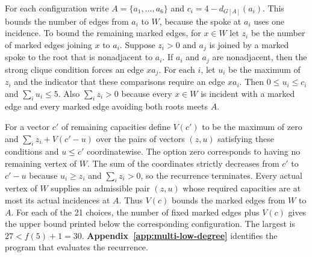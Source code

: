 \documentclass[preprint,11pt,numbers]{elsarticle-arxiv}
\numberwithin{equation}{section}
\theoremstyle{definition}
\begin{document}
For each configuration write $A=\{a_1,\ldots,a_6\}$ and
$c_i=4-d_{G[A]}(a_i)$. This bounds the number of edges from
$a_i$ to $W$, because the spoke at $a_i$ uses one incidence.
To bound the remaining marked edges, for $x\in W$ let $z_i$
be the number of marked edges joining $x$ to $a_i$. Suppose
$z_i>0$ and $a_j$ is joined by a marked spoke to the root that
is nonadjacent to $a_i$. If $a_i$ and $a_j$ are nonadjacent,
then the strong clique condition forces an edge $xa_j$.
For each $i$, let $u_i$ be the maximum of $z_i$ and the
indicator that these comparisons require an edge $xa_i$.
Then $0\leq u_i\leq c_i$ and $\sum_i u_i\leq5$. Also
$\sum_i z_i>0$ because every $x\in W$ is incident with a marked
edge and every marked edge avoiding both roots meets $A$.

For a vector $c'$ of remaining capacities define $V(c')$
to be the maximum of zero and $\sum_i z_i+V(c'-u)$ over the
pairs of vectors $(z,u)$ satisfying these conditions and
$u\leq c'$ coordinatewise. The option zero corresponds to
having no remaining vertex of $W$. The sum of the
coordinates strictly decreases from $c'$ to $c'-u$ because
$u_i\geq z_i$ and $\sum_i z_i>0$, so the recurrence terminates.
Every actual vertex of $W$ supplies an admissible pair
$(z,u)$ whose required capacities are at most its actual
incidences at $A$. Thus $V(c)$ bounds the marked edges from
$W$ to $A$.
For each of the 21 choices, the number of fixed marked edges plus
$V(c)$ gives the upper bound printed below the corresponding
configuration. The largest is $27< f(5)+1=30$.
\textbf{Appendix~\ref{app:multi-low-degree}} identifies the program
that evaluates the recurrence.
\end{document}
